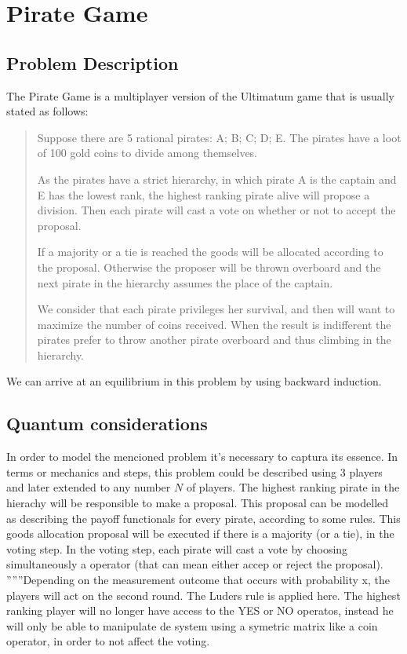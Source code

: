 \section{Pirate Game}
\label{sec:pirate}

\subsection{Problem Description}
\label{subsec:description}

The Pirate Game is a multiplayer version of the Ultimatum game that is usually stated as follows:

\begin{quotation}
Suppose there are 5 rational pirates: A; B; C; D; E. The pirates have a  loot of 100 gold coins to divide among themselves.


As the pirates have a strict hierarchy, in which pirate A is the captain and E has the lowest rank, the highest ranking pirate alive will propose a division. Then each pirate will cast a vote on whether or not to accept the proposal. 

If a majority or a tie is reached the goods will be allocated according to the proposal. Otherwise the proposer will be thrown overboard and the next pirate in the hierarchy assumes the place of the captain. 

We consider that each pirate privileges her survival, and then will want to maximize the number of coins received. When the result is indifferent the pirates prefer to throw another pirate overboard and thus climbing in the hierarchy. 
\end{quotation}

We can arrive at an equilibrium in this problem by using backward induction. 


\subsection{Quantum considerations}

In order to model the mencioned problem it's necessary to captura its essence.
In terms or mechanics and steps, this problem could be described using 3 players and later extended to any number $N$ of players. The highest ranking pirate in the hierachy will be responsible to make a proposal. This proposal can be modelled as describing the payoff functionals for every pirate, according to some rules. This goods allocation proposal will be executed if there is a majority (or a tie), in the voting step. In the voting step, each pirate will cast a vote by choosing simultaneously a operator (that can mean either accep or reject the proposal).
''''''Depending on the measurement outcome that occurs with probability x, the players will act on the second round. The Luders rule is applied here. The highest ranking player will no longer have access to the YES or NO operatos, instead he will only be able to manipulate de system using a symetric matrix like a coin operator, in order to not affect the voting.

